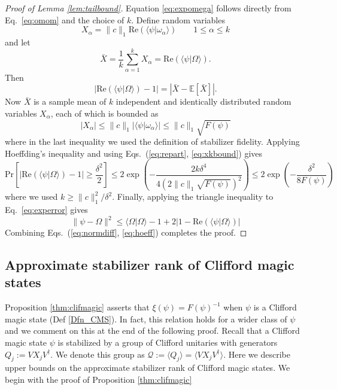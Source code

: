 \begin{proof}[Proof of Lemma \ref{lem:tailbound}]
Equation \eqref{eq:expomega} follows directly from Eq.~\eqref{eq:omom} and the choice of $k$. Define random variables
\[
X_\alpha=\|c\|_1 \mathrm{Re}(\langle \psi|\omega_\alpha\rangle) \qquad 1\leq\alpha \leq k
\]
and let 
\[
\bar{X}=\frac{1}{k}\sum_{\alpha=1}^{k} X_\alpha=\mathrm{Re}(\langle \psi|\Omega\rangle).
\]
Then
\begin{equation}
\left|\mathrm{Re}(\langle \psi|\Omega\rangle)-1\right|=\left|\bar{X}-\mathbb{E}[\bar{X}]\right|.
\label{eq:repart}
\end{equation}
Now $\bar{X}$ is a sample mean of $k$ independent and identically distributed random variables $X_\alpha$,  each of which is bounded as
\begin{equation}
|X_\alpha|\leq \|c\|_1 |\langle \psi|\omega_\alpha\rangle| \leq \|c\|_1 \sqrt{F(\psi)}
\label{eq:xkbound}
\end{equation}
where in the last inequality we used the definition of stabilizer fidelity. Applying Hoeffding's inequality \cite{hoeffding1963probability} and using Eqs.~(\ref{eq:repart}, \ref{eq:xkbound}) gives
\begin{equation}
\mathrm{Pr}\left[\left|\mathrm{Re}(\langle \psi|\Omega\rangle)-1\right|\geq \frac{\delta^2}{2}\right]\leq 2\exp\left(-\frac{2k\delta^4}{4\left(2\|c\|_1\sqrt{F(\psi)}\right)^2}\right) \leq 2\exp\left(-\frac{\delta^2}{8F(\psi)}\right)
\label{eq:hoeff}
\end{equation}
where we used $k\geq \|c\|_1^2/\delta^2$. Finally, applying the triangle inequality to Eq.~\eqref{eq:experror} gives
\begin{equation}
\|\psi-\Omega\|^2 \leq \langle \Omega|\Omega\rangle-1+2\left|1-\mathrm{Re}(\langle \psi|\Omega\rangle)\right| 
\label{eq:normdiff}
\end{equation}
Combining Eqs.~(\ref{eq:normdiff}, \ref{eq:hoeff}) completes the proof.


\end{proof}

\subsection{Approximate stabilizer rank of Clifford magic states}
\label{Sec_Clifford_Magic_States}
Proposition \ref{thm:clifmagic} asserts that $\xi(\psi)=F(\psi)^{-1}$ when $\psi$ is a Clifford magic state (Def \ref{Dfn_CMS}). In fact, this relation holds for a wider class of $\psi$ and we comment on this at the end of the following proof. Recall that a Clifford magic state $\psi$ is stabilized by a group of Clifford unitaries with generators $Q_j:=V X_j V^\dagger$.  We denote this group as $\mathcal{Q}:=\langle Q_j \rangle = \langle V X_j V^\dagger \rangle$. Here we describe upper bounds on the approximate stabilizer rank of Clifford magic states. We begin with the proof of Proposition \ref{thm:clifmagic}

